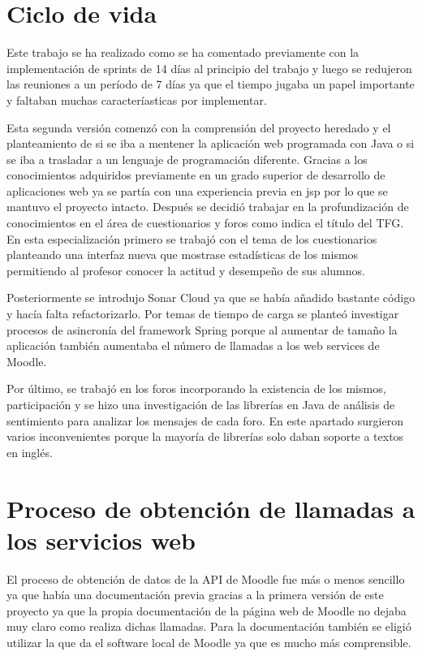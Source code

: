 \section{Ciclo de vida}
Este trabajo se ha realizado como se ha comentado previamente con la implementación de sprints de 14 días al principio del trabajo y luego se redujeron las reuniones a un período de 7 días ya que el tiempo jugaba un papel importante y faltaban muchas caracteríasticas por implementar.

Esta segunda versión comenzó con la comprensión del proyecto heredado y el planteamiento de si se iba a mentener la aplicación web programada con Java o si se iba a trasladar a un lenguaje de programación diferente. Gracias a los conocimientos adquiridos previamente en un grado superior de desarrollo de aplicaciones web ya se partía con una experiencia previa en jsp por lo que se mantuvo el proyecto intacto.
Después se decidió trabajar en la profundización de conocimientos en el área de cuestionarios y foros como indica el título del TFG. En esta especialización primero se trabajó con el tema de los cuestionarios planteando una interfaz nueva que mostrase estadísticas de los mismos permitiendo al profesor conocer la actitud y desempeño de sus alumnos.

Posteriormente se introdujo Sonar Cloud ya que se había añadido bastante código y hacía falta refactorizarlo. Por temas de tiempo de carga se planteó investigar procesos de asincronía del framework Spring porque al aumentar de tamaño la aplicación también aumentaba el número de llamadas a los web services de Moodle.

Por último, se trabajó en los foros incorporando la existencia de los mismos, participación y se hizo una investigación de las librerías en Java de análisis de sentimiento para analizar los mensajes de cada foro. En este apartado surgieron varios inconvenientes porque la mayoría de librerías solo daban soporte a textos en inglés.

\section{Proceso de obtención de llamadas a los servicios web}
El proceso de obtención de datos de la API de Moodle fue más o menos sencillo ya que había una documentación previa gracias a la primera versión de este proyecto ya que la propia documentación de la página web de Moodle no dejaba muy claro como realiza dichas llamadas.
Para la documentación también se eligió utilizar la que da el software local de Moodle ya que es mucho más comprensible.

